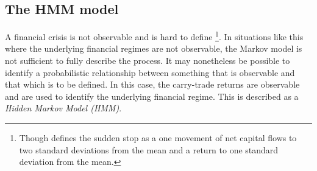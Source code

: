 \documentclass[12pt, a4paper, oneside]{article}\usepackage[]{graphicx}\usepackage[]{color}
\begin{document}



\subsection{The HMM model}
A financial crisis is not observable and is hard to define \footnote{Though \citet{CalvoSS} defines the sudden stop as a one movement of net capital flows to two standard deviations from the mean and a return to one standard deviation from the mean.}.  In situations like this where the underlying financial regimes are not observable, the Markov model is not sufficient to fully describe the process. It may nonetheless be possible to identify a probabilistic relationship between something that is observable and that which is to be defined.  In this case, the carry-trade returns are observable and are used to identify the underlying financial regime.  This is described as a \emph{Hidden Markov Model (HMM)}. 
\end{document}
